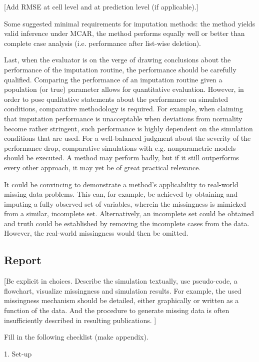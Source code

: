 \documentclass[bimj,fleqn]{w-art}
\begin{document}
[Add RMSE at cell level and at prediction level (if applicable).]

Some suggested minimal requirements for imputation methods: the method yields valid inference under MCAR, the method performs equally well or better than complete case analysis (i.e. performance after list-wise deletion).

Last, when the evaluator is on the verge of drawing conclusions about the performance of the imputation routine, the performance should be carefully qualified. Comparing the performance of an imputation routine given a population (or true) parameter allows for quantitative evaluation. However, in order to pose qualitative statements about the performance on simulated conditions, comparative methodology is required. For example, when claiming that imputation performance is unacceptable when deviations from normality become rather stringent, such performance is highly dependent on the simulation conditions that are used. For a well-balanced judgment about the severity of the performance drop, comparative simulations with e.g. nonparametric models should be executed. A method may perform badly, but if it still outperforms every other approach, it may yet be of great practical relevance.

It could be convincing to demonstrate a method's applicability to real-world missing data problems. This can, for example, be achieved by obtaining and imputing a fully observed set of variables, wherein the missingness is mimicked from a similar, incomplete set. Alternatively, an incomplete set could be obtained and truth could be established by removing the incomplete cases from the data. However, the real-world missingness would then be omitted.



\subsection{Report}

[Be explicit in choices. Describe the simulation textually, use pseudo-code, a flowchart, visualize missingness and simulation results. For example, the used missingness mechanism should be detailed, either graphically or written as a function of the data. And the procedure to generate missing data is often insufficiently described in resulting publications. ]


Fill in the following checklist (make appendix).

1. Set-up
\end{document}
